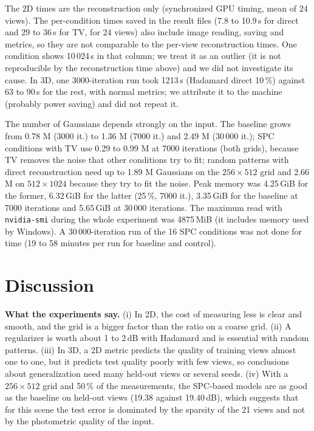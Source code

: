 \documentclass[conference]{IEEEtran}
\begin{document}
The 2D times are the reconstruction only (synchronized GPU timing, mean of 24 views). The per-condition times saved in the
result files (7.8 to 10.9\,s for direct and 29 to 36\,s for TV, for 24 views) also include image reading, saving and metrics,
so they are not comparable to the per-view reconstruction times. One condition shows 10\,024\,s in that column; we treat it
as an outlier (it is not reproducible by the reconstruction time above) and we did not investigate its cause.
In 3D, one 3000-iteration run took 1213\,s (Hadamard direct 10\,\%) against 63 to 90\,s for the rest, with normal metrics; we
attribute it to the machine (probably power saving) and did not repeat it.

The number of Gaussians depends strongly on the input. The baseline grows from 0.78 M (3000 it.) to 1.36 M (7000 it.) and
2.49 M (30\,000 it.); SPC conditions with TV use 0.29 to 0.99 M at 7000 iterations (both grids), because TV removes the noise that other
conditions try to fit; random patterns with direct reconstruction need up to 1.89 M Gaussians on the $256\times512$ grid and 2.66 M on
$512\times1024$ because they try to fit the noise. Peak memory was 4.25\,GiB for the former, 6.32\,GiB for the latter (25\,\%,
7000 it.), 3.35\,GiB for the baseline at 7000 iterations and 5.65\,GiB at 30\,000 iterations. The maximum read with \texttt{nvidia-smi} during the whole experiment was 4875\,MiB (it
includes memory used by Windows). A 30\,000-iteration run of the 16 SPC conditions was not done for time (19 to 58 minutes per
run for baseline and control).

\section{Discussion}
\textbf{What the experiments say.} (i) In 2D, the cost of measuring less is clear and smooth, and the grid is a bigger factor
than the ratio on a coarse grid. (ii) A regularizer is worth about 1 to 2\,dB with Hadamard and is essential with random
patterns. (iii) In 3D, a 2D metric predicts the quality of training views almost one to one, but it predicts test quality
poorly with few views, so conclusions about generalization need many held-out views or several seeds. (iv) With a
$256\times512$ grid and 50\,\% of the measurements, the SPC-based models are as good as the baseline on held-out views
(19.38 against 19.40\,dB), which suggests that for this scene the test error is dominated by the sparsity of the 21 views and
not by the photometric quality of the input.
\end{document}
